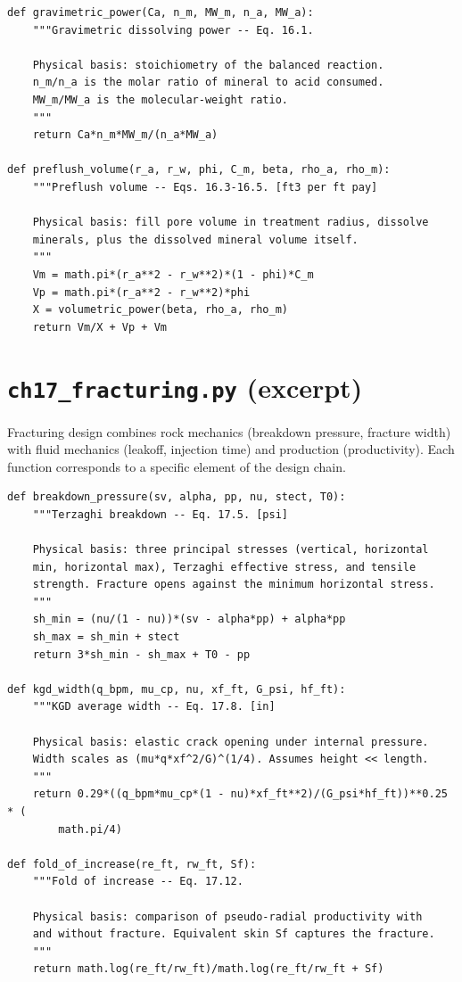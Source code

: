 \documentclass[11pt,a4paper,openany]{book}
\newcommand{\code}[1]{\texttt{#1}}
\begin{document}
\begin{lstlisting}
def gravimetric_power(Ca, n_m, MW_m, n_a, MW_a):
    """Gravimetric dissolving power -- Eq. 16.1.

    Physical basis: stoichiometry of the balanced reaction.
    n_m/n_a is the molar ratio of mineral to acid consumed.
    MW_m/MW_a is the molecular-weight ratio.
    """
    return Ca*n_m*MW_m/(n_a*MW_a)

def preflush_volume(r_a, r_w, phi, C_m, beta, rho_a, rho_m):
    """Preflush volume -- Eqs. 16.3-16.5. [ft3 per ft pay]

    Physical basis: fill pore volume in treatment radius, dissolve
    minerals, plus the dissolved mineral volume itself.
    """
    Vm = math.pi*(r_a**2 - r_w**2)*(1 - phi)*C_m
    Vp = math.pi*(r_a**2 - r_w**2)*phi
    X = volumetric_power(beta, rho_a, rho_m)
    return Vm/X + Vp + Vm
\end{lstlisting}

\section{\code{ch17\_fracturing.py} (excerpt)}

\begin{theory}
Fracturing design combines rock mechanics (breakdown pressure,
fracture width) with fluid mechanics (leakoff, injection time) and
production (productivity). Each function corresponds to a specific
element of the design chain.
\end{theory}

\begin{lstlisting}
def breakdown_pressure(sv, alpha, pp, nu, stect, T0):
    """Terzaghi breakdown -- Eq. 17.5. [psi]

    Physical basis: three principal stresses (vertical, horizontal
    min, horizontal max), Terzaghi effective stress, and tensile
    strength. Fracture opens against the minimum horizontal stress.
    """
    sh_min = (nu/(1 - nu))*(sv - alpha*pp) + alpha*pp
    sh_max = sh_min + stect
    return 3*sh_min - sh_max + T0 - pp

def kgd_width(q_bpm, mu_cp, nu, xf_ft, G_psi, hf_ft):
    """KGD average width -- Eq. 17.8. [in]

    Physical basis: elastic crack opening under internal pressure.
    Width scales as (mu*q*xf^2/G)^(1/4). Assumes height << length.
    """
    return 0.29*((q_bpm*mu_cp*(1 - nu)*xf_ft**2)/(G_psi*hf_ft))**0.25 * (
        math.pi/4)

def fold_of_increase(re_ft, rw_ft, Sf):
    """Fold of increase -- Eq. 17.12.

    Physical basis: comparison of pseudo-radial productivity with
    and without fracture. Equivalent skin Sf captures the fracture.
    """
    return math.log(re_ft/rw_ft)/math.log(re_ft/rw_ft + Sf)
\end{lstlisting}
\end{document}
